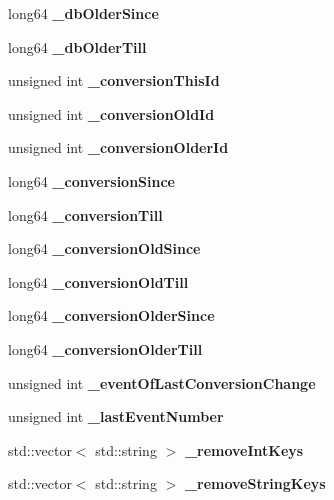 \begin{DoxyCompactItemize}
\item 
long64 {\bfseries \-\_\-db\-Older\-Since}\label{classTestCondDataProcessor_a583de6d8771a9bb9f456b00aed5a2156}

\item 
long64 {\bfseries \-\_\-db\-Older\-Till}\label{classTestCondDataProcessor_ad22a60287fb2832a0d63c384c2153697}

\item 
unsigned int {\bfseries \-\_\-conversion\-This\-Id}\label{classTestCondDataProcessor_a3f4afe455b079294200d50a7d06e25ff}

\item 
unsigned int {\bfseries \-\_\-conversion\-Old\-Id}\label{classTestCondDataProcessor_abdd4c175f828b67ff078f8072794dd9a}

\item 
unsigned int {\bfseries \-\_\-conversion\-Older\-Id}\label{classTestCondDataProcessor_a55eeec30d100acfa72bb32861b251dd7}

\item 
long64 {\bfseries \-\_\-conversion\-Since}\label{classTestCondDataProcessor_ae247e8c77442ae59dbe85769a6e6e913}

\item 
long64 {\bfseries \-\_\-conversion\-Till}\label{classTestCondDataProcessor_a1aa7fc8bf8a7ddea31a9cd6c5a408051}

\item 
long64 {\bfseries \-\_\-conversion\-Old\-Since}\label{classTestCondDataProcessor_a934a82f1318df98035c50cdf2c3f8c27}

\item 
long64 {\bfseries \-\_\-conversion\-Old\-Till}\label{classTestCondDataProcessor_a7898024668fd8e6257bc435262dda884}

\item 
long64 {\bfseries \-\_\-conversion\-Older\-Since}\label{classTestCondDataProcessor_ae930fc00b6884a40cd5b316f681a5879}

\item 
long64 {\bfseries \-\_\-conversion\-Older\-Till}\label{classTestCondDataProcessor_af3d750a4a4a75defaaffc3de72784696}

\item 
unsigned int {\bfseries \-\_\-event\-Of\-Last\-Conversion\-Change}\label{classTestCondDataProcessor_a38a245f1958e98eb1e30b77b00a7da42}

\item 
unsigned int {\bfseries \-\_\-last\-Event\-Number}\label{classTestCondDataProcessor_a35e011c605f61bc2d17cfa2b883669ec}

\item 
std\-::vector$<$ std\-::string $>$ {\bfseries \-\_\-remove\-Int\-Keys}\label{classTestCondDataProcessor_a00f3686cf22f78880505bbbbbad633f0}

\item 
std\-::vector$<$ std\-::string $>$ {\bfseries \-\_\-remove\-String\-Keys}\label{classTestCondDataProcessor_a9dcf5ad17bcae719fcc7e810610593d1}

\end{DoxyCompactItemize}


